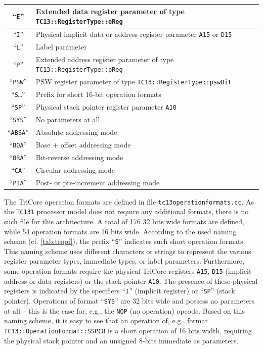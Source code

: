 \begin{table}[t]
\begin{center}
\begin{tabular}{|c|p{136mm}|}
      \hline
      ``\texttt{E}'' & Extended data register parameter of type \texttt{TC13::RegisterType::eReg} \\
      \hline
      ``\texttt{I}'' & Physical implicit data or address register parameter \texttt{A15} or \texttt{D15} \\
      \hline
      ``\texttt{L}'' & Label parameter \\
      \hline
      ``\texttt{P}'' & Extended address register parameter of type \texttt{TC13::RegisterType::pReg} \\
      \hline
      ``\texttt{PSW}'' & \gls{PSW} register parameter of type \texttt{TC13::RegisterType::pswBit} \\
      \hline
      ``\texttt{S\dots}'' & Prefix for short 16-bit operation formats \\
      \hline
      ``\texttt{SP}'' & Physical stack pointer register parameter \texttt{A10} \\
      \hline
      ``\texttt{SYS}'' & No parameters at all \\
      \hhline{|=|=|}
      ``\texttt{ABSA}'' & Absolute addressing mode \\
      \hline
      ``\texttt{BOA}'' & Base + offset addressing mode \\
      \hline
      ``\texttt{BRA}'' & Bit-reverse addressing mode \\
      \hline
      ``\texttt{CA}'' & Circular addressing mode \\
      \hline
      ``\texttt{PIA}'' & Post- or pre-increment addressing mode \\
      \hline
    \end{tabular}
  \end{center}
\end{table}

The TriCore operation formats are defined in file \texttt{tc13operationformats.cc}.
As the \texttt{TC131} processor model does not require any additional formats, there is no such file for this architecture.
A total of 176 32 bits wide formats are defined, while 54 operation formats are 16 bits wide.
According to the used naming scheme (cf. \cref{tab:tcopf}), the prefix ``\texttt{S}'' indicates such short operation formats.
This naming scheme uses different characters or strings to represent the various register parameter types, immediate types, or label parameters.
Furthermore, some operation formats require the physical TriCore registers \texttt{A15}, \texttt{D15} (implicit address or data registers) or the stack pointer \texttt{A10}.
The presence of these physical registers is indicated by the specifiers ``\texttt{I}'' (implicit register) or ``\texttt{SP}'' (stack pointer).
Operations of format ``\texttt{SYS}'' are 32 bits wide and possess no parameters at all -- this is the case for, e.g., the \texttt{NOP} (no operation) opcode.
Based on this naming scheme, it is easy to see that an operation of, e.g., format \texttt{TC13::OperationFormat::SSPC8} is a short operation of 16 bits width, requiring the physical stack pointer and an unsigned 8-bits immediate as parameters.

